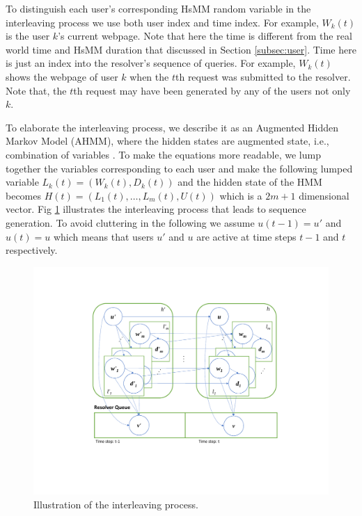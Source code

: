	To distinguish each user's corresponding HsMM random variable in the interleaving process we use both user index and time index. For example, $W_{k}(t)$ is the user $k$'s current webpage. 
	Note that here the time is different from the real world time and HsMM duration that discussed in Section \ref{subsec:user}. 
	Time here is just an index into the resolver's sequence of queries.
	For example, $W_{k}(t)$ shows the webpage of user $k$ when the $t$th request was submitted to the resolver. 
	Note that, the $t$th request may have been generated by any of the users not only $k$. 
	
	To elaborate the interleaving process, we describe it as an Augmented Hidden Markov Model (AHMM), where the hidden states are augmented state, i.e., combination of variables \cite{minot2014separation}. 
	To make the equations more readable, we lump together the variables corresponding to each user and make the following lumped variable $L_k(t) = (W_{k}(t), D_{k}(t))$ and the hidden state of the HMM becomes $H(t) = (L_1(t), \dots, L_m(t), U(t))$ which is a $2m +1$ dimensional vector.
	Fig \ref{fig:rq} illustrates the interleaving process that leads to sequence generation.
	To avoid cluttering in the following we assume $u(t-1) = u'$ and $u(t) = u$ which means that users $u'$ and $u$ are active at time steps $t-1$ and $t$ respectively. 
	\begin{figure}
		\centering
		\includegraphics[width=.45\textwidth]{./img/hsmm-q2}
		\caption{Illustration of the interleaving process.}
		\label{fig:rq}
	\end{figure} 
	
